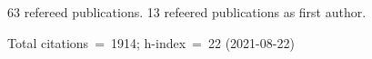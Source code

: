 63 refereed publications. 13 refeered publications as first author.

Total citations~=~1914; h-index~=~22 (2021-08-22)